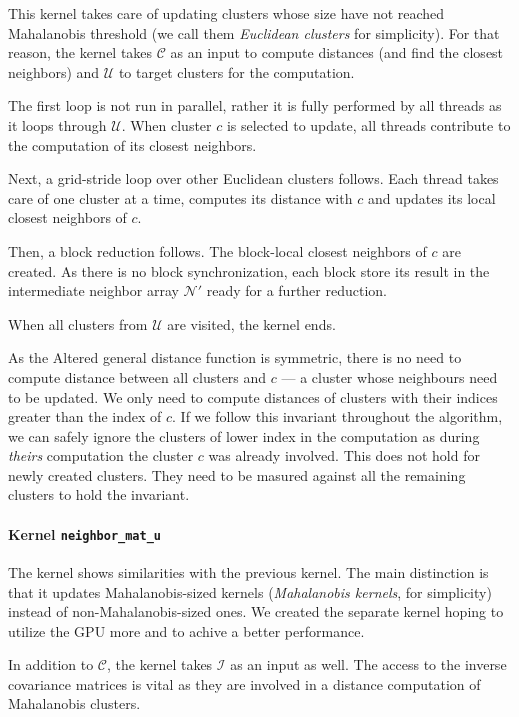 This kernel takes care of updating clusters whose size have not reached Mahalanobis threshold (we call them \emph{Euclidean clusters} for simplicity). For that reason, the kernel takes $\mathcal{C}$ as an input to compute distances (and find the closest neighbors) and $\mathcal{U}$ to target clusters for the computation.

The first loop is not run in parallel, rather it is fully performed by all threads as it loops through $\mathcal{U}$. When cluster $c$ is selected to update, all threads contribute to the computation of its closest neighbors.

Next, a grid-stride loop over other Euclidean clusters follows. Each thread takes care of one cluster at a time, computes its distance with $c$ and updates its local closest neighbors of $c$.

Then, a block reduction follows. The block-local closest neighbors of $c$ are created. As there is no block synchronization, each block store its result in the intermediate neighbor array $\mathcal{N}'$ ready for a further reduction.

When all clusters from $\mathcal{U}$ are visited, the kernel ends.

\begin{rem}
	As the Altered general distance function is symmetric, there is no need to compute distance between all clusters and $c$ --- a cluster whose neighbours need to be updated. We only need to compute distances of clusters with their indices greater than the index of $c$. If we follow this invariant throughout the algorithm, we can safely ignore the clusters of lower index in the computation as during \emph{theirs} computation the cluster $c$ was already involved. This does not hold for newly created clusters. They need to be masured against all the remaining clusters to hold the invariant.
\end{rem}

\paragraph{Kernel \texttt{neighbor\_mat\_u}} The kernel shows similarities with the previous kernel. The main distinction is that it updates Mahalanobis-sized kernels (\emph{Mahalanobis kernels}, for simplicity) instead of non-Mahalanobis-sized ones. We created the separate kernel hoping to utilize the GPU more and to achive a better performance.

In addition to $\mathcal{C}$, the kernel takes $\mathcal{I}$ as an input as well. The access to the inverse covariance matrices is vital as they are involved in a distance computation of Mahalanobis clusters. 

